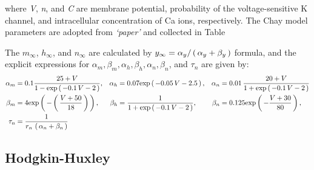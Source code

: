 \documentclass[../../Orator.tex]{subfiles}
\begin{document}
where \textit{V}, \textit{n}, and \textit{C} are membrane potential, probability of the voltage-sensitive \gls{K} channel, and intracellular concentration of \gls{Ca} ions, respectively. The Chay model parameters are adopted from \textit{`paper'} and collected in Table

The \(m_\infty\), \(h_\infty\), and \(n_\infty\) are calculated by \(y_\infty = \alpha_y / \left(\,\alpha_y + \beta_y\,\right) \) formula, and the explicit expressions for 
\(\alpha_m, \beta_m, \alpha_h, \beta_h, \alpha_n, \beta_n\), and \(\tau_n\) are given by:
\begin{align*}
    \alpha_m &= 0.1 \frac{ 25 + V }{1 - \mathrm{exp}\left(\,-0.1 \, V - 2\,\right)}, &
    \alpha_h &=  0.07 \mathrm{exp}\left(\,-0.05\,V -2.5\,\right), &
    \alpha_n &= 0.01 \, \frac{ 20 + V }{ 1 + \mathrm{exp}\left(\,-0.1 \, V - 2\,\right)} \\
    \beta_m  &= 4 \mathrm{exp}\left(\,-\left(\,\frac{ V + 50 }{ 18 } \,\right) \,\right), &
    \beta_h  &= \frac{ 1 }{ 1 + \mathrm{exp}\left(\,-0.1 \, V - 2\,\right)}, &
    \beta_n  &= 0.125 \mathrm{exp}\left(\,- \frac{V + 30}{80}\,\right), \\
    \tau_n &= \frac{1}{ r_n \, \left(\,\alpha_n + \beta_n\,\right) }
\end{align*}



\newpage
\subsection{Hodgkin-Huxley}\label{sec:HHMeth}
\end{document}
